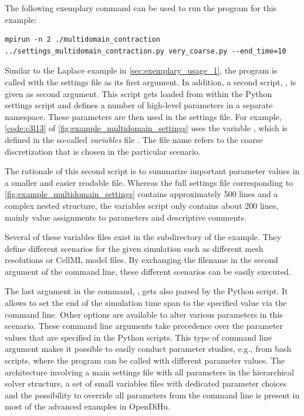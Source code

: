 The following exemplary command can be used to run the program for this example:
\begin{lstlisting}[columns=fullflexible,breaklines=true,postbreak=\mbox{\textcolor{gray}{$\hookrightarrow$}\space}]
  mpirun -n 2 ./multidomain_contraction ../settings_multidomain_contraction.py very_coarse.py --end_time=10
\end{lstlisting}
Similar to the Laplace example in \cref{sec:exemplary_usage_1}, the program  is called with the settings file  as its first argument. In addition, a second script, , is given as second argument. This script gets loaded from within the Python settings script and defines a number of high-level parameters in a separate  namespace. These parameters are then used in the settings file. For example, \cref{code:c3l13} of \cref{fig:example_multidomain_settings} uses the variable , which is defined in the so-called \emph{variables} file . The file name refers to the coarse discretization that is chosen in the particular scenario.

The rationale of this second script is to summarize important parameter values in a smaller and easier readable file. Whereas the full settings file corresponding to \cref{fig:example_multidomain_settings} contains approximately 500 lines and a complex nested structure, the variables script only contains about 200 lines, mainly value assignments to parameters and descriptive comments. 

Several of these variables files exist in the  subdirectory of the example. They define different scenarios for the given simulation such as different mesh resolutions or CellML model files. By exchanging the filename in the second argument of the command line, these different scenarios can be easily executed.

The last argument in the command, , gets also parsed by the Python script. It allows to set the end of the simulation time span to the specified value via the command line. Other options are available to alter various parameters in this scenario. These command line arguments take precedence over the parameter values that are specified in the Python scripts. This type of command line argument makes it possible to easily conduct parameter studies, e.g., from bash scripts, where the program can be called with different parameter values.
The architecture involving a main settings file with all parameters in the hierarchical solver structure, a set of small variables files with dedicated parameter choices and the possibility to override all parameters from the command line is present in most of the advanced examples in OpenDiHu.

